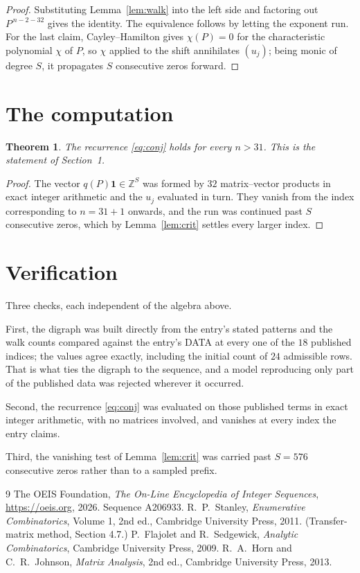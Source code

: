\documentclass[11pt,a4paper]{article}
\theoremstyle{plain}
\newtheorem{theorem}{Theorem}
\theoremstyle{definition}
\begin{document}
\begin{proof}
Substituting Lemma~\ref{lem:walk} into the left side and factoring out
$P^{\,n-2-32}$ gives the identity. The equivalence follows by letting the exponent
run. For the last claim, Cayley--Hamilton gives $\chi(P)=0$ for the characteristic
polynomial $\chi$ of $P$, so $\chi$ applied to the shift annihilates $(u_j)$; being monic of
degree $S$, it propagates $S$ consecutive zeros forward.
\end{proof}

\section{The computation}

\begin{theorem}
The recurrence \eqref{eq:conj} holds for every $n>31$. This is the statement of
Section~1.
\end{theorem}

\begin{proof}
The vector $q(P)\mathbf{1}\in\mathbb{Z}^{S}$ was formed by $32$ matrix--vector
products in exact integer arithmetic and the $u_j$ evaluated in turn. They vanish from the
index corresponding to $n=31+1$ onwards, and the run was continued past $S$ consecutive
zeros, which by Lemma~\ref{lem:crit} settles every larger index.
\end{proof}

\section{Verification}

Three checks, each independent of the algebra above.

First, the digraph was built directly from the entry's stated patterns and the walk counts
compared against the entry's DATA at every one of the $18$ published indices; the
values agree exactly, including the initial count of $24$ admissible rows. That is
what ties the digraph to the sequence, and a model reproducing only part of the published
data was rejected wherever it occurred.

Second, the recurrence \eqref{eq:conj} was evaluated on those published terms in exact
integer arithmetic, with no matrices involved, and vanishes at every index the entry claims.

Third, the vanishing test of Lemma~\ref{lem:crit} was carried past $S=576$ consecutive
zeros rather than to a sampled prefix.

\begin{thebibliography}{9}
 The OEIS Foundation, \emph{The On-Line Encyclopedia of Integer
Sequences}, \url{https://oeis.org}, 2026. Sequence A206933.
 R.~P.~Stanley, \emph{Enumerative Combinatorics}, Volume 1, 2nd ed.,
Cambridge University Press, 2011. (Transfer-matrix method, Section 4.7.)
 P.~Flajolet and R.~Sedgewick, \emph{Analytic Combinatorics}, Cambridge
University Press, 2009.
 R.~A.~Horn and C.~R.~Johnson, \emph{Matrix Analysis}, 2nd ed., Cambridge
University Press, 2013.
\end{thebibliography}
\end{document}
